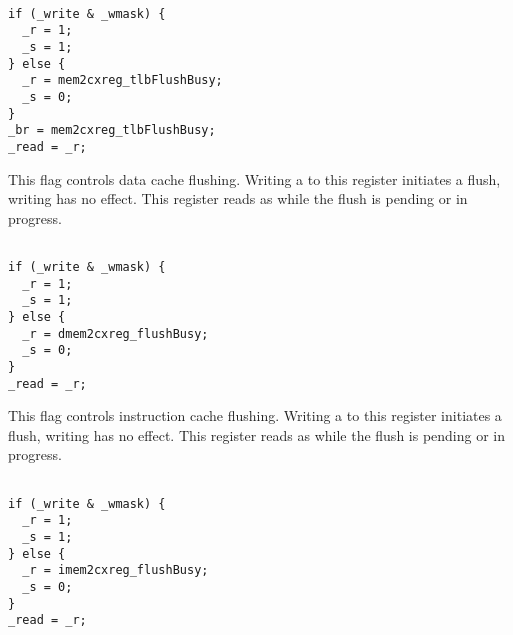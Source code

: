 \declaration{}
\implementation{}
\begin{lstlisting}

if (_write & _wmask) {
  _r = 1;
  _s = 1;
} else {
  _r = mem2cxreg_tlbFlushBusy;
  _s = 0;
}
_br = mem2cxreg_tlbFlushBusy;
_read = _r;

\end{lstlisting}

This flag controls data cache flushing. Writing a  to this register 
initiates a flush, writing  has no effect. This register reads as 
 while the flush is pending or in progress.

\declaration{}
\implementation{}
\begin{lstlisting}

if (_write & _wmask) {
  _r = 1;
  _s = 1;
} else {
  _r = dmem2cxreg_flushBusy;
  _s = 0;
}
_read = _r;

\end{lstlisting}

This flag controls instruction cache flushing. Writing a  to this 
register initiates a flush, writing  has no effect. This register reads 
as  while the flush is pending or in progress.

\declaration{}
\implementation{}
\begin{lstlisting}

if (_write & _wmask) {
  _r = 1;
  _s = 1;
} else {
  _r = imem2cxreg_flushBusy;
  _s = 0;
}
_read = _r;

\end{lstlisting}


